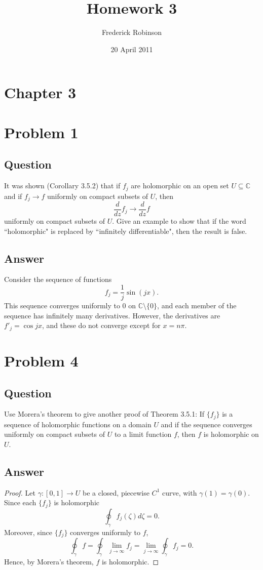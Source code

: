 \documentclass[11pt]{article}
\begin{document}



\title{Homework 3}
\author{Frederick Robinson}
\date{20 April 2011}
\maketitle


\section*{Chapter 3}

\section{Problem 1}
\subsection{Question}
It was shown (Corollary 3.5.2) that if $f_j$ are holomorphic on an open set $U \subseteq \mathbb{C}$ and if $f_j \to f$ uniformly on compact subsets of $U$, then
\[\frac{d}{dz} f_j \to \frac{d}{dz} f\]
uniformly on compact subsets of $U$. Give an example to show that if the word ``holomorphic" is replaced by ``infinitely differentiable", then the result is false.
\subsection{Answer}
Consider the sequence of functions
\[f_j = \frac{1}{j} \sin(j x).\]
This sequence converges uniformly to 0 on $\mathbb{C} \setminus \{0\}$, and each member of the sequence has infinitely many derivatives. However, the derivatives are $f'_j=\cos {jx}$, and these do not converge except for $x = n \pi$.


\section{Problem 4}
\subsection{Question}
Use Morera's theorem to give another proof of Theorem 3.5.1: If $\{ f_j\}$ is a sequence of holomorphic functions on a domain $U$ and if the sequence converges uniformly on compact subsets of $U$ to a limit function $f$, then $f$ is holomorphic on $U$.
\subsection{Answer}
\begin{proof}
Let $\gamma:[0,1] \to U$ be a closed, piecewise $C^1$ curve, with $\gamma(1) = \gamma(0)$. Since each $\{f_j\}$ is holomorphic
\[\oint_\gamma f_j(\zeta) d \zeta = 0.\]
Moreover, since $\{f_j\}$ converges uniformly to $f$,
\[ \oint_\gamma f = \oint_\gamma \lim_{j \to \infty} f_j = \lim_{j \to \infty} \oint_\gamma f_j= 0.\]
Hence, by Morera's theorem, $f$ is holomorphic.
\end{proof}
\end{document}
